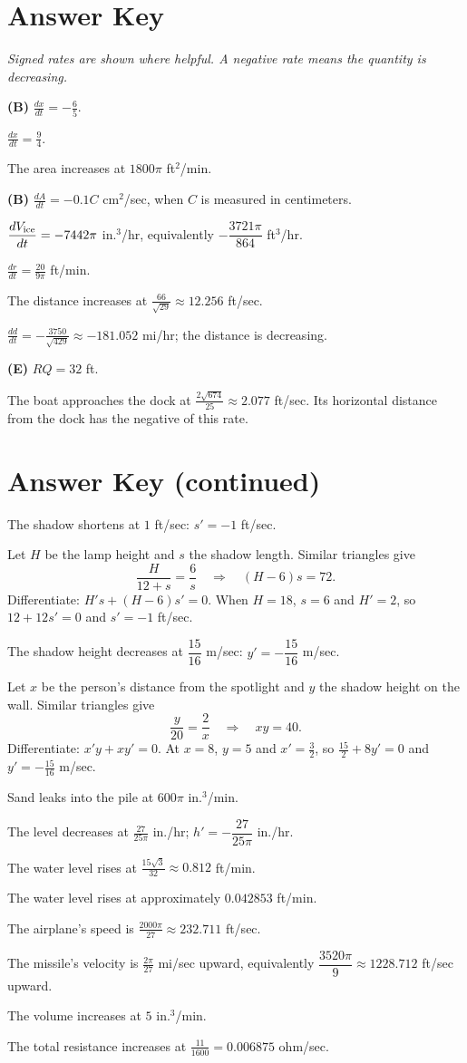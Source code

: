 \documentclass[11pt]{article}
\newcommand{\ansitem}[1]{\item[\textbf{#1.}]}
\begin{document}
\section*{Answer Key}
\textit{Signed rates are shown where helpful. A negative rate means the quantity is decreasing.}
\begin{description}[leftmargin=2.8em,labelwidth=2em,itemsep=13pt]
\ansitem{1} \textbf{(B)} $\displaystyle\frac{dx}{dt}=-\frac65$.
\ansitem{2} $\displaystyle\frac{dx}{dt}=\frac94$.
\ansitem{3} The area increases at $1800\pi$ ft$^2$/min.
\ansitem{4} \textbf{(B)} $\displaystyle\frac{dA}{dt}=-0.1C$ cm$^2$/sec, when $C$ is measured in centimeters.
\ansitem{5} $\displaystyle\frac{dV_{\rm ice}}{dt}=-7442\pi$ in.$^3$/hr, equivalently $-\dfrac{3721\pi}{864}$ ft$^3$/hr.
\ansitem{6} $\displaystyle\frac{dr}{dt}=\frac{20}{9\pi}$ ft/min.
\ansitem{7} The distance increases at $\displaystyle\frac{66}{\sqrt{29}}\approx12.256$ ft/sec.
\ansitem{8} $\displaystyle\frac{dd}{dt}=-\frac{3750}{\sqrt{429}}\approx-181.052$ mi/hr; the distance is decreasing.
\ansitem{9} \textbf{(E)} $RQ=32$ ft.
\ansitem{10} The boat approaches the dock at $\displaystyle\frac{2\sqrt{674}}{25}\approx2.077$ ft/sec. Its horizontal distance from the dock has the negative of this rate.
\end{description}
\clearpage
\section*{Answer Key \textnormal{(continued)}}
\begin{description}[leftmargin=2.8em,labelwidth=2em,itemsep=11pt]
\ansitem{11} The shadow shortens at $1$ ft/sec: $s'=-1$ ft/sec.
\par\smallskip Let $H$ be the lamp height and $s$ the shadow length. Similar triangles give
\[\frac{H}{12+s}=\frac6s \quad\Longrightarrow\quad (H-6)s=72.\]
Differentiate: $H's+(H-6)s'=0$. When $H=18$, $s=6$ and $H'=2$, so $12+12s'=0$ and $s'=-1$ ft/sec.
\ansitem{12} The shadow height decreases at $\dfrac{15}{16}$ m/sec: $y'=-\dfrac{15}{16}$ m/sec.
\par\smallskip Let $x$ be the person's distance from the spotlight and $y$ the shadow height on the wall. Similar triangles give
\[\frac{y}{20}=\frac2x \quad\Longrightarrow\quad xy=40.\]
Differentiate: $x'y+xy'=0$. At $x=8$, $y=5$ and $x'=\frac32$, so $\frac{15}{2}+8y'=0$ and $y'=-\frac{15}{16}$ m/sec.
\ansitem{13} Sand leaks into the pile at $600\pi$ in.$^3$/min.
\ansitem{14} The level decreases at $\displaystyle\frac{27}{25\pi}$ in./hr; $h'=-\dfrac{27}{25\pi}$ in./hr.
\ansitem{15} The water level rises at $\displaystyle\frac{15\sqrt3}{32}\approx0.812$ ft/min.
\ansitem{16} The water level rises at approximately $0.042853$ ft/min.
\ansitem{17} The airplane's speed is $\displaystyle\frac{2000\pi}{27}\approx232.711$ ft/sec.
\ansitem{18} The missile's velocity is $\displaystyle\frac{2\pi}{27}$ mi/sec upward, equivalently $\dfrac{3520\pi}{9}\approx1228.712$ ft/sec upward.
\ansitem{19} The volume increases at $5$ in.$^3$/min.
\ansitem{20} The total resistance increases at $\displaystyle\frac{11}{1600}=0.006875$ ohm/sec.
\end{description}
\clearpage
\end{document}
